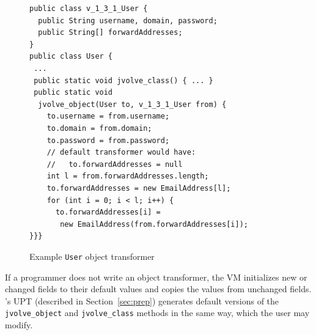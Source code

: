 \begin{figure}
\begin{small}
\begin{verbatim}
public class v_1_3_1_User {
  public String username, domain, password;
  public String[] forwardAddresses;
}
public class User {
 ...
 public static void jvolve_class() { ... }
 public static void 
  jvolve_object(User to, v_1_3_1_User from) {
    to.username = from.username;
    to.domain = from.domain;
    to.password = from.password;
    // default transformer would have:
    //   to.forwardAddresses = null
    int l = from.forwardAddresses.length;
    to.forwardAddresses = new EmailAddress[l];
    for (int i = 0; i < l; i++) {
      to.forwardAddresses[i] = 
       new EmailAddress(from.forwardAddresses[i]);
}}}
\end{verbatim}
\end{small}
\caption{Example \texttt{User} object transformer}
\label{fig:example-xform}
\end{figure}

If a programmer does not write an object transformer, the VM %
initializes new or changed fields to their default values and copies the
values from unchanged fields. \DSU{}'s \ac{UPT} (described in
Section~\ref{sec:prep}) generates
default versions of the \texttt{jvolve\_object} and
\texttt{jvolve\_class} methods in the same way, which the user may
modify.










